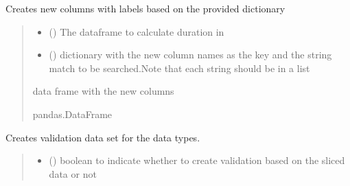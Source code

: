 \documentclass[letterpaper,10pt,english]{sphinxmanual}
\begin{document}
\begin{fulllineitems}
\begin{fulllineitems}
\label{\detokenize{BeeData:BeeData.BeeData.create_actions}}
\pysigstartsignatures
{}
\pysigstopsignatures
\sphinxAtStartPar
Creates new columns with labels based on  the provided dictionary
\begin{quote}\begin{description}
\begin{itemize}
\item {} 
\sphinxAtStartPar
{} () \textendash{} The dataframe to calculate duration in

\item {} 
\sphinxAtStartPar
{} () \textendash{} dictionary with the new column names as the key and the string match to be searched.Note that each string should be in a list

\end{itemize}

\sphinxAtStartPar
data frame with the new columns

\sphinxAtStartPar
pandas.DataFrame

\end{description}\end{quote}

\end{fulllineitems}


\begin{fulllineitems}
\label{\detokenize{BeeData:BeeData.BeeData.create_validate_data}}
\pysigstartsignatures
{}
\pysigstopsignatures
\sphinxAtStartPar
Creates validation data set for the data types.
\begin{quote}\begin{description}
\begin{itemize}
\item {} 
\sphinxAtStartPar
{} () \textendash{} boolean to indicate whether to create validation based on the sliced data or not


\end{itemize}
\end{description}
\end{quote}
\end{fulllineitems}
\end{fulllineitems}
\end{document}
